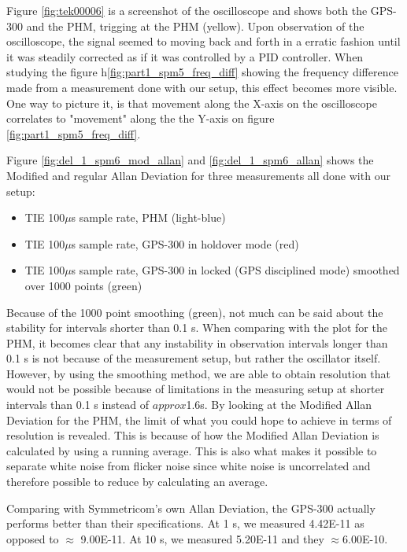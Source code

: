 \documentclass[11pt,english,a4paper]{article}
\begin{document}
Figure \ref{fig:tek00006} is a screenshot of the oscilloscope and shows both the GPS-300 and the PHM, trigging at the PHM (yellow). Upon observation of the oscilloscope, the signal seemed to moving back and forth in a erratic fashion until it was steadily corrected as if it was controlled by a PID controller. When studying the figure h\ref{fig:part1_spm5_freq_diff} showing the frequency difference made from a measurement done with our setup, this effect becomes more visible. One way to picture it, is that movement along the X-axis on the oscilloscope correlates to "movement" along the the Y-axis on figure \ref{fig:part1_spm5_freq_diff}. 


\newpage
Figure \ref{fig:del_1_spm6_mod_allan} and \ref{fig:del_1_spm6_allan} shows the Modified and regular Allan Deviation for three measurements all done with our setup:
\begin{itemize}
  \item TIE 100$\mu$s sample rate, PHM (light-blue)
  \item TIE 100$\mu$s sample rate, GPS-300 in holdover mode (red)
  \item TIE 100$\mu$s sample rate, GPS-300 in locked (GPS disciplined mode) smoothed over 1000 points (green)
\end{itemize}
Because of the 1000 point smoothing (green), not much can be said about the stability for intervals shorter than 0.1 s. When comparing with the plot for the PHM, it becomes clear that any instability in observation intervals longer than 0.1 s is not because of the measurement setup, but rather the oscillator itself. However, by using the smoothing method, we are able to obtain resolution that would not be possible because of limitations in the measuring setup at shorter intervals than 0.1 s instead of $approx$1.6s. By looking at the Modified Allan Deviation for the PHM, the limit of what you could hope to achieve in terms of resolution is revealed. This is because of how the Modified Allan Deviation is calculated by using a running average. This is also what makes it possible to separate white noise from flicker noise since white noise is uncorrelated and therefore possible to reduce by calculating an average.   

Comparing with Symmetricom's own Allan Deviation, the GPS-300 actually performs better than their specifications. At 1 s, we measured 4.42E-11 as opposed to $\approx$ 9.00E-11. At 10 s, we measured 5.20E-11 and they $\approx$6.00E-10.
\end{document}
